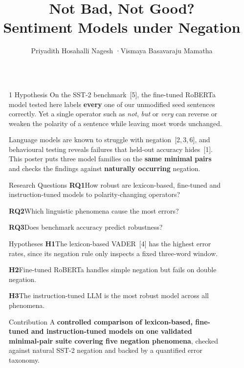 \documentclass[final]{beamer}
\title{Not Bad, Not Good?\\Sentiment Models under Negation}
\author{Priyadith Hosahalli Nagesh \quad·\quad Vismaya Basavaraju Mamatha}
\institute{Trends in Natural Language Processing \quad·\quad SoSe 2026}
\newlength{\sepwidth}
\newlength{\colwidth}
\newcommand{\separatorcolumn}{\begin{column}{\sepwidth}\end{column}}
\newcommand{\hyp}[2]{\textbf{\color{navy}#1}\enspace #2\par}
\begin{document}
\begin{frame}[t]
\begin{columns}[t]
\separatorcolumn

\begin{column}{\colwidth}

\begin{block}{1 \textbullet{} Hypothesis}
On the SST-2 benchmark~[5], the fine-tuned RoBERTa model tested here labels \textbf{every} one of our unmodified seed sentences correctly. Yet a single operator such as \emph{not}, \emph{but} or \emph{very} can reverse or weaken the polarity of a sentence while leaving most words unchanged.

Language models are known to struggle with negation~[2,\,3,\,6], and behavioural testing reveals failures that held-out accuracy hides~[1]. This poster puts three model families on the \textbf{same minimal pairs} and checks the findings against \textbf{naturally occurring} negation.
\end{block}

\begin{alertblock}{Research Questions}
\hyp{RQ1}{How robust are lexicon-based, fine-tuned and instruction-tuned models to polarity-changing operators?}
\hyp{RQ2}{Which linguistic phenomena cause the most errors?}
\hyp{RQ3}{Does benchmark accuracy predict robustness?}
\end{alertblock}

\begin{block}{Hypotheses}
\hyp{H1}{The lexicon-based VADER~[4] has the highest error rates, since its negation rule only inspects a fixed three-word window.}
\hyp{H2}{Fine-tuned RoBERTa handles simple negation but fails on double negation.}
\hyp{H3}{The instruction-tuned LLM is the most robust model across all phenomena.}
\end{block}

\begin{block}{Contribution}
A \textbf{controlled comparison of lexicon-based, fine-tuned and instruction-tuned models on one validated minimal-pair suite covering five negation phenomena}, checked against natural SST-2 negation and backed by a quantified error taxonomy.
\end{block}


\end{column}
\separatorcolumn

\begin{column}{\colwidth}


\end{column}
\end{columns}
\end{frame}
\end{document}

